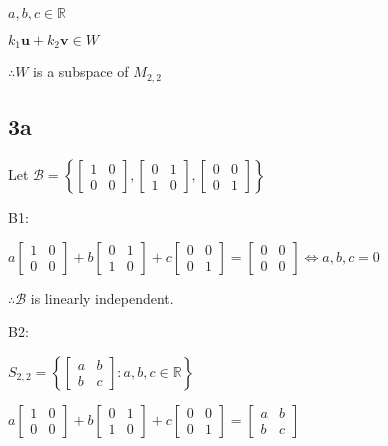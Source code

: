 \documentclass{article}
\begin{document}
$a, b, c \in \mathbb{R}$

$k_1 \mathbf{u} + k_2 \mathbf{v} \in W$

$\therefore W$ is a subspace of $M_{2,2}$
\newpage
\subsection*{3a}
\noindent
Let $\mathcal{B} = \left\{
\begin{bmatrix}
1 & 0\\
0 & 0
\end{bmatrix}, 
\begin{bmatrix}
0 & 1\\
1 & 0
\end{bmatrix},
\begin{bmatrix}
0 & 0\\
0 & 1
\end{bmatrix}\right\}$

\noindent
B1:

$a \begin{bmatrix}
1 & 0\\
0 & 0
\end{bmatrix} + 
b \begin{bmatrix}
0 & 1\\
1 & 0
\end{bmatrix} +
c \begin{bmatrix}
0 & 0\\
0 & 1
\end{bmatrix} = 
\begin{bmatrix}
0 & 0\\
0 & 0
\end{bmatrix} \iff a, b, c = 0$


$\therefore \mathcal{B}$ is linearly independent.

\noindent
B2:

$S_{2,2} = \left\{
\begin{bmatrix}
a & b\\
b & c
\end{bmatrix}: a, b, c \in \mathbb{R}
\right\}$

$a \begin{bmatrix}
1 & 0\\
0 & 0
\end{bmatrix} + 
b \begin{bmatrix}
0 & 1\\
1 & 0
\end{bmatrix} +
c \begin{bmatrix}
0 & 0\\
0 & 1
\end{bmatrix} = 
\begin{bmatrix}
a & b\\
b & c
\end{bmatrix}$
\end{document}
